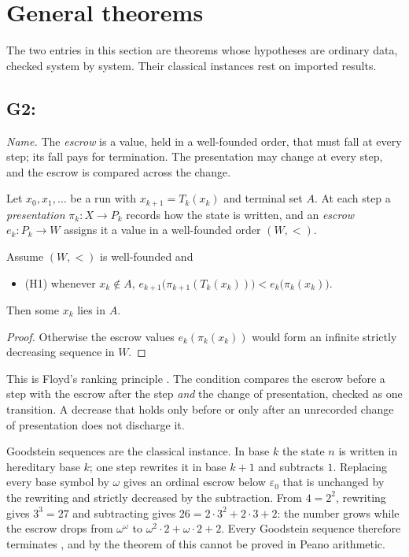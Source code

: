 \section{General theorems}\label{sec:theorems}

The two entries in this section are theorems whose hypotheses are ordinary data, checked system by
system. Their classical instances rest on imported results.

\subsection{G2: \lawGTwo}\label{sec:G2}

\emph{Name.} The \emph{escrow} is a value, held in a well-founded order, that must fall at every
step; its fall pays for termination. The presentation may change at every step, and the escrow is
compared across the change.

Let $x_0, x_1, \ldots$ be a run with $x_{k+1} = T_k(x_k)$ and terminal set $A$. At each step a
\emph{presentation} $\pi_k : X \to P_k$ records how the state is written, and an \emph{escrow}
$e_k : P_k \to W$ assigns it a value in a well-founded order $(W, <)$.

\begin{theorem}\label{thm:G2}
Assume $(W, <)$ is well-founded and
\begin{itemize}
  \item \textup{(H1)} whenever $x_k \notin A$,
    $e_{k+1}\bigl(\pi_{k+1}(T_k(x_k))\bigr) < e_k\bigl(\pi_k(x_k)\bigr)$.
\end{itemize}
Then some $x_k$ lies in $A$.
\end{theorem}

\begin{proof}
Otherwise the escrow values $e_k(\pi_k(x_k))$ would form an infinite strictly decreasing sequence in $W$.
\end{proof}

This is Floyd's ranking principle \citep{Floyd1967}. The condition compares the escrow before a
step with the escrow after the step \emph{and} the change of presentation, checked as one
transition. A decrease that holds only before or only after an unrecorded change of presentation
does not discharge it.

Goodstein sequences are the classical instance. In base $k$ the state $n$ is written in hereditary
base $k$; one step rewrites it in base $k+1$ and subtracts $1$. Replacing every base symbol by
$\omega$ gives an ordinal escrow below $\varepsilon_0$ that is unchanged by the rewriting and
strictly decreased by the subtraction. From $4 = 2^2$, rewriting gives $3^3 = 27$ and subtracting
gives $26 = 2\cdot 3^2 + 2 \cdot 3 + 2$: the number grows while the escrow drops from
$\omega^\omega$ to $\omega^2 \cdot 2 + \omega \cdot 2 + 2$. Every Goodstein sequence therefore
terminates \citep{Goodstein1944}, and by the theorem of \citet{KirbyParis1982} this cannot be proved
in Peano arithmetic.


